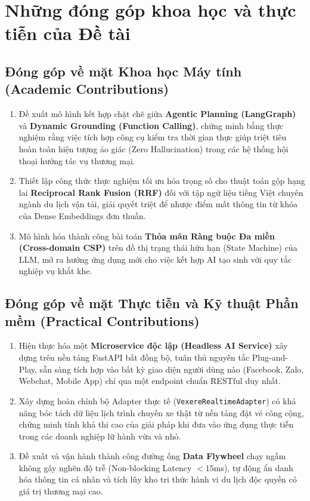 \section{Những đóng góp khoa học và thực tiễn của Đề tài}

\subsection{Đóng góp về mặt Khoa học Máy tính (Academic Contributions)}
\begin{enumerate}
    \item Đề xuất mô hình kết hợp chặt chẽ giữa \textbf{Agentic Planning (LangGraph)} và \textbf{Dynamic Grounding (Function Calling)}, chứng minh bằng thực nghiệm rằng việc tích hợp công cụ kiểm tra thời gian thực giúp triệt tiêu hoàn toàn hiện tượng ảo giác (Zero Hallucination) trong các hệ thống hội thoại hướng tác vụ thương mại.
    \item Thiết lập công thức thực nghiệm tối ưu hóa trọng số cho thuật toán gộp hạng lai \textbf{Reciprocal Rank Fusion (RRF)} đối với tập ngữ liệu tiếng Việt chuyên ngành du lịch vận tải, giải quyết triệt để nhược điểm mất thông tin từ khóa của Dense Embeddings đơn thuần.
    \item Mô hình hóa thành công bài toán \textbf{Thỏa mãn Ràng buộc Đa miền (Cross-domain CSP)} trên đồ thị trạng thái hữu hạn (State Machine) của LLM, mở ra hướng ứng dụng mới cho việc kết hợp AI tạo sinh với quy tắc nghiệp vụ khắt khe.
\end{enumerate}

\subsection{Đóng góp về mặt Thực tiễn và Kỹ thuật Phần mềm (Practical Contributions)}
\begin{enumerate}
    \item Hiện thực hóa một \textbf{Microservice độc lập (Headless AI Service)} xây dựng trên nền tảng FastAPI bất đồng bộ, tuân thủ nguyên tắc Plug-and-Play, sẵn sàng tích hợp vào bất kỳ giao diện người dùng nào (Facebook, Zalo, Webchat, Mobile App) chỉ qua một endpoint chuẩn RESTful duy nhất.
    \item Xây dựng hoàn chỉnh bộ Adapter thực tế (\texttt{VexereRealtimeAdapter}) có khả năng bóc tách dữ liệu lịch trình chuyến xe thật từ nền tảng đặt vé công cộng, chứng minh tính khả thi cao của giải pháp khi đưa vào ứng dụng thực tiễn trong các doanh nghiệp lữ hành vừa và nhỏ.
    \item Đề xuất và vận hành thành công đường ống \textbf{Data Flywheel} chạy ngầm không gây nghẽn độ trễ (Non-blocking Latency $< 15$ms), tự động ẩn danh hóa thông tin cá nhân và tích lũy kho tri thức hành vi du lịch độc quyền có giá trị thương mại cao.
\end{enumerate}

